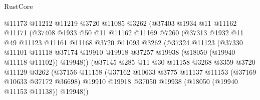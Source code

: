 \begin{lexlean}{RustCore}
\begin{coremodule}
                          @11173
                          @11212
                          @11219
                          @3720
                          @11085
                          @3262
                          (@37403
                            @1934
                            @11
                            @11162
                            @11171
                            (@37408
                              @1933
                              @50
                              @11
                              @11162
                              @11169
                              @7260
                              (@37313
                                @1932
                                @11
                                @49
                                @11123
                                @11161
                                @11168
                                @3720
                                @11093
                                @3262
                                (@37324
                                  @11123
                                  (@37330
                                    @11101
                                    @11118
                                    @37174
                                    @19910
                                    @19918
                                    @37257
                                    @19938
                                    (@18050 (@19940 @11118 @11102))
                                    @19948))
                                (@37145
                                  @285
                                  @11
                                  @30
                                  @11158
                                  @3268
                                  @3359
                                  @3720
                                  @11129
                                  @3262
                                  (@37156
                                    @11158
                                    (@37162
                                      @10633
                                      @3775
                                      @11137
                                      @11153
                                      (@37169 @10633 @37172 @36698)
                                      @19910
                                      @19918
                                      @37050
                                      @19938
                                      (@18050 (@19940 @11153 @11138))
                                      @19948))

\end{coremodule}
\end{lexlean}
